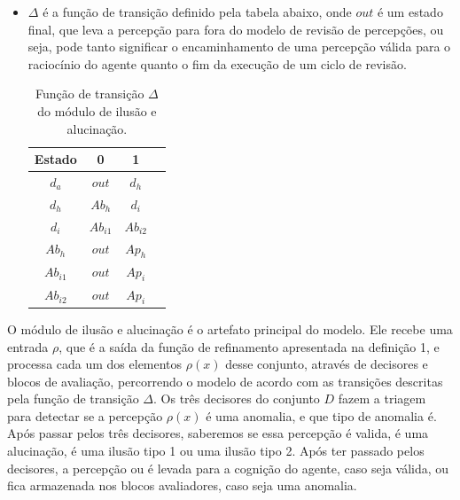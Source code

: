 \begin{definition}
\begin{itemize}
        \item $\Delta$ é a função de transição definido pela tabela abaixo, onde $out$ é um estado final, que leva a percepção para fora do modelo de revisão de percepções, ou seja, pode tanto significar o encaminhamento de uma percepção válida para o raciocínio do agente quanto o fim da execução de um ciclo de revisão.
        
            \begin{table}[htb]
                \caption{Função de transição $\Delta$ do módulo de ilusão e alucinação.}
                \centering
                \begin{tabular}{c c c c} 
                    \toprule
                    \textbf{Estado} & \textbf{0} & \textbf{1} \\
                    \midrule
                    $d_{a}$     & $out$     & $d_{h}$       \\
                    $d_{h}$     & $Ab_{h}$  & $d_{i}$       \\
                    $d_{i}$     & $Ab_{i1}$ & $Ab_{i2}$     \\
                    $Ab_{h}$    & $out$     & $Ap_{h}$      \\
                    $Ab_{i1}$   & $out$     & $Ap_{i}$      \\
                    $Ab_{i2}$   & $out$     & $Ap_{i}$      \\
                    \bottomrule
                \end{tabular}
                \label{transition-table}
                
            \end{table}
    \end{itemize}{}
\end{definition}{}

O módulo de ilusão e alucinação é o artefato principal do modelo. Ele recebe uma entrada $\rho$, que é a saída da função de refinamento apresentada na definição 1, e processa cada um dos elementos $\rho(x)$ desse conjunto, através de decisores e blocos de avaliação, percorrendo o modelo de acordo com as transições descritas pela função de transição $\Delta$. Os três decisores do conjunto $D$ fazem a triagem para detectar se a percepção $\rho(x)$ é uma anomalia, e que tipo de anomalia é. Após passar pelos três decisores, saberemos se essa percepção é valida, é uma alucinação, é uma ilusão tipo 1 ou uma ilusão tipo 2. Após ter passado pelos decisores, a percepção ou é levada para a cognição do agente, caso seja válida, ou fica armazenada nos blocos avaliadores, caso seja uma anomalia.

